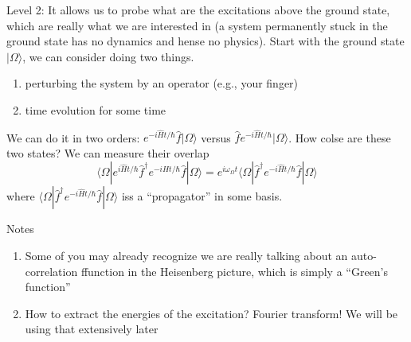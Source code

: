 Level 2: It allows us to probe what are the excitations above the ground state, which are really what we are interested in (a system permanently stuck in the ground state has no dynamics and hense no physics). Start with the ground state $|\Omega\rangle$, we can consider doing two things.
\begin{enumerate}
    \item perturbing the system by an operator (e.g., your finger)
    \item time evolution for some time
\end{enumerate}

We can do it in two orders: $e^{-i\hat{H}t/\hbar}\hat{f}|\Omega \rangle$ versus $\hat{f}e^{-i\hat{H}t/\hbar}|\Omega \rangle$. How colse are these two states? We can measure their overlap
\[ \langle \Omega |e^{i\hat{H}t/\hbar}\hat{f}^{\dagger}e^{-i\hat{H}t/\hbar}\hat{f}|\Omega \rangle =e^{i\omega _{\Omega}t}\langle \Omega |\hat{f}^{\dagger}e^{-i\hat{H}t/\hbar}\hat{f}|\Omega \rangle \]
where $\langle \Omega |\hat{f}^{\dagger}e^{-i\hat{H}t/\hbar}\hat{f}|\Omega \rangle$ iss a ``propagator'' in some basis.

Notes
\begin{enumerate}
    \item Some of you may already recognize we are really talking about an auto-correlation ffunction in the Heisenberg picture, which is simply a ``Green's function''
    \item How to extract the energies of the excitation? Fourier transform! We will be using that extensively later
\end{enumerate}

